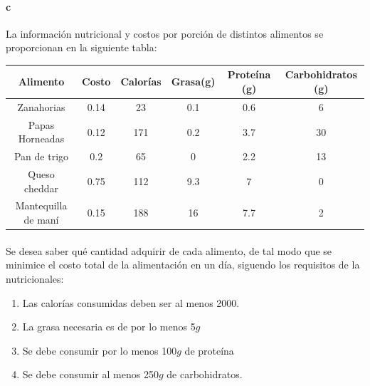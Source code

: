 \documentclass{article}
\begin{document}
	\paragraph{c} 
	La información nutricional y costos por porción de distintos alimentos se proporcionan en la siguiente tabla:
	\begin{table}[h!]
		\centering
		\begin{tabular}{c | c | c | c | c | c} 
			\hline
			\hline
			Alimento  & Costo  & Calorías & Grasa(g) & Proteína (g) & Carbohidratos (g)\\ [0.5ex] 
			\hline
			Zanahorias & 0.14 & 23 & 0.1 & 0.6 & 6 \\ 
			Papas Horneadas & 0.12 & 171 & 0.2 & 3.7 &30\\
			Pan de trigo & 0.2 & 65 & 0 & 2.2 & 13 \\
			Queso cheddar & 0.75 & 112 & 9.3 & 7 & 0 \\
			Mantequilla de maní & 0.15 & 188 & 16 & 7.7 & 2 \\
			\hline
			\hline
		\end{tabular}
	\end{table}
	\paragraph{} Se desea saber qué cantidad adquirir de cada alimento, de tal modo que se minimice el costo total de la alimentación en un día, siguendo los requisitos de la nutricionales: 
	\begin{enumerate}
		\item Las calorías consumidas deben ser al menos 2000.
		\item La grasa necesaria es de por lo menos 5$g$
		\item Se debe consumir por lo menos 100$g$ de proteína
		\item Se debe consumir al menos 250$g$ de carbohidratos.
	\end{enumerate}
\end{document}
